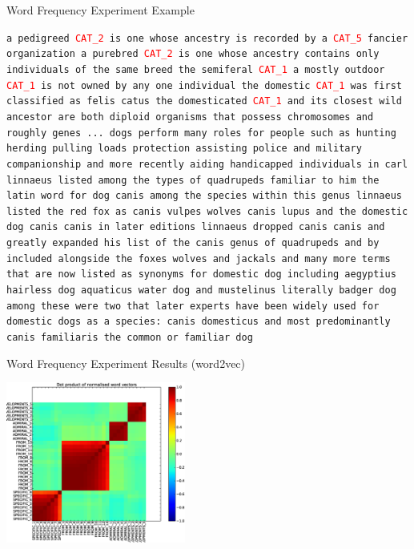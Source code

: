 \documentclass{beamer}
\begin{document}
\begin{frame}{Word Frequency Experiment Example}
	\par
	{\small
\texttt{a pedigreed \textcolor{red}{CAT\_2} is one whose ancestry is recorded by a \textcolor{red}{CAT\_5} fancier organization
a purebred \textcolor{red}{CAT\_2} is one whose ancestry contains only individuals of the same breed
the semiferal \textcolor{red}{CAT\_1} a mostly outdoor \textcolor{red}{CAT\_1} is not owned by any one individual
the domestic \textcolor{red}{CAT\_1} was first classified as felis catus
the domesticated \textcolor{red}{CAT\_1} and its closest wild ancestor are both diploid organisms that possess  chromosomes and roughly  genes
...
dogs perform many roles for people such as hunting herding pulling loads protection assisting police and military companionship and more recently aiding handicapped individuals in  carl linnaeus listed among the types of quadrupeds familiar to him the latin word for dog canis among the species within this genus linnaeus listed the red fox as canis vulpes wolves canis lupus and the domestic dog canis canis in later editions linnaeus dropped canis canis and greatly expanded his list of the canis genus of quadrupeds and by  included alongside the foxes wolves and jackals and many more terms that are now listed as synonyms for domestic dog including aegyptius hairless dog aquaticus water dog and mustelinus literally badger dog among these were two that later experts have been widely used for domestic dogs as a species: canis domesticus and most predominantly canis familiaris the common or familiar dog} \par}
\end{frame}

\begin{frame}{Word Frequency Experiment Results (word2vec)}
	\begin{center}
	\includegraphics[height=200px]{word-frequency-experiment-heatmap} \\
	\end{center}
\end{frame}
\end{document}
